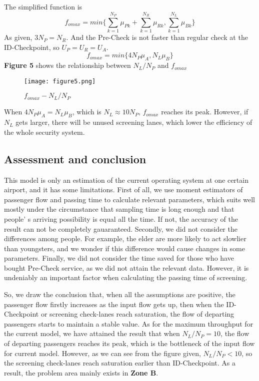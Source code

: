 \documentclass{mcmthesis}
\begin{document}
The simplified function is
$$f_{o max}= min\{\sum_{k=1}^{N_P}\mu_{Pk}+\sum_{k=1}^{N_R}\mu_{Rk},\sum_{k=1}^{N_L}\mu_{Bk}\}$$
As given, $3N_P=N_R$. And the Pre-Check is not faster than regular check at the ID-Checkpoint, so $U_P=U_R=U_A$.
$$f_{o max}= min\{4N_P\mu_A,N_L\mu_B\}$$
\textbf{Figure 5} shows the relationship between $N_L/N_P$ and $f_{omax}$

\begin{figure}[H]
\small
\centering
\texttt{[image: figure5.png]}
\caption{$f_{omax}-N_L/N_P$} \label{fig:$f_{omax}-N_L/N_P$}
\end{figure}
\noindent When $4N_P\mu_A=N_L\mu_B$, which is $N_L\approx10N_P$, $f_{omax}$ reaches its peak. However, if $N_L$ gets larger, there will be unused screening lanes, which lower the efficiency of the whole security system.
\subsection{Assessment and conclusion}
This model is only an estimation of the current operating system at one certain airport, and it has some limitations. First of all, we use moment estimators of passenger flow and passing time to calculate relevant parameters, which suits well mostly under the circumstance that sampling time is long enough and that people' s  arriving possibility is equal all the time. If not, the accuracy of the result can not be completely gauaranteed. Secondly, we did not consider the differences among people. For example, the elder are more likely to act slowlier than youngsters, and we wonder if this difference would cause changes in some parameters. Finally, we did not consider the time saved for those who have bought Pre-Check service, as we did not attain the relevant data. However, it is undeniably an important factor when calculating the passing time of screening.

So, we draw the conclusion that, when all the assumptions are positive, the passenger flow firstly increases as the input flow gets up, then when the ID-Checkpoint or screening check-lanes reach saturation, the flow of departing passengers starts to maintain a stable value. As for the maximum throughput for the current model, we have attained the result that when $N_L/N_P=10$, the flow of departing passengers reaches its peak, which is the bottleneck of the input flow for current model. However, as we can see from the figure given, $N_L/N_P<10$, so the screening check-lanes reach saturation earlier than ID-Checkpoint. As a result, the problem area mainly exists in \textbf{Zone B}.
\end{document}
